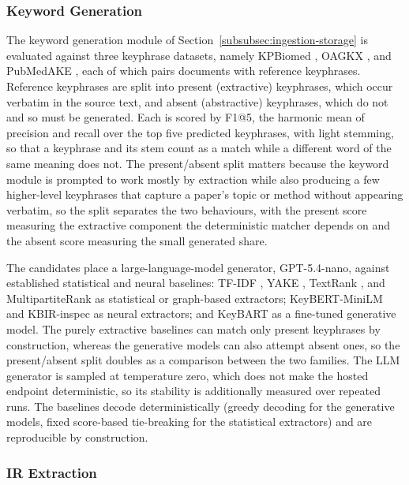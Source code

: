 \subsubsection{Keyword Generation}
\label{subsubsec:keyword-generation}

The keyword generation module of Section~\ref{subsubsec:ingestion-storage} is evaluated against three keyphrase datasets, namely KPBiomed \cite{houbre2022kpbiomed}, OAGKX \cite{cano2020oagkx}, and PubMedAKE \cite{sheng2022pubmedake}, each of which pairs documents with reference keyphrases. Reference keyphrases are split into present (extractive) keyphrases, which occur verbatim in the source text, and absent (abstractive) keyphrases, which do not and so must be generated. Each is scored by F1@5, the harmonic mean of precision and recall over the top five predicted keyphrases, with light stemming, so that a keyphrase and its stem count as a match while a different word of the same meaning does not. The present/absent split matters because the keyword module is prompted to work mostly by extraction while also producing a few higher-level keyphrases that capture a paper's topic or method without appearing verbatim, so the split separates the two behaviours, with the present score measuring the extractive component the deterministic matcher depends on and the absent score measuring the small generated share.

The candidates place a large-language-model generator, GPT-5.4-nano, against established statistical and neural baselines: TF-IDF \cite{salton1988termweighting}, YAKE \cite{campos2020yake}, TextRank \cite{mihalcea2004textrank}, and MultipartiteRank \cite{boudin2018multipartiterank} as statistical or graph-based extractors; KeyBERT-MiniLM \cite{grootendorst2020keybert} and KBIR-inspec \cite{kulkarni2022kbir} as neural extractors; and KeyBART \cite{kulkarni2022kbir} as a fine-tuned generative model. The purely extractive baselines can match only present keyphrases by construction, whereas the generative models can also attempt absent ones, so the present/absent split doubles as a comparison between the two families. The LLM generator is sampled at temperature zero, which does not make the hosted endpoint deterministic, so its stability is additionally measured over repeated runs. The baselines decode deterministically (greedy decoding for the generative models, fixed score-based tie-breaking for the statistical extractors) and are reproducible by construction.

\subsubsection{IR Extraction}
\label{subsubsec:ir-extraction}

